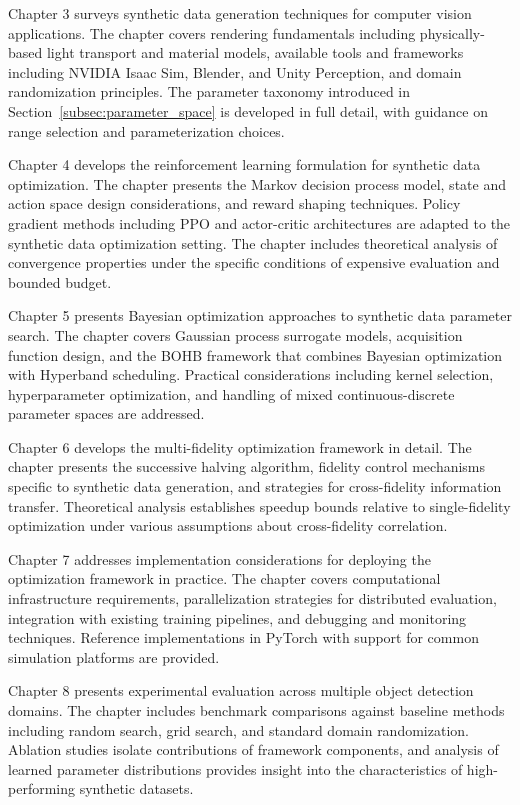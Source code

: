 Chapter 3 surveys synthetic data generation techniques for computer vision applications. The chapter covers rendering fundamentals including physically-based light transport and material models, available tools and frameworks including NVIDIA Isaac Sim, Blender, and Unity Perception, and domain randomization principles. The parameter taxonomy introduced in Section~\ref{subsec:parameter_space} is developed in full detail, with guidance on range selection and parameterization choices.

Chapter 4 develops the reinforcement learning formulation for synthetic data optimization. The chapter presents the Markov decision process model, state and action space design considerations, and reward shaping techniques. Policy gradient methods including PPO and actor-critic architectures are adapted to the synthetic data optimization setting. The chapter includes theoretical analysis of convergence properties under the specific conditions of expensive evaluation and bounded budget.

Chapter 5 presents Bayesian optimization approaches to synthetic data parameter search. The chapter covers Gaussian process surrogate models, acquisition function design, and the BOHB framework that combines Bayesian optimization with Hyperband scheduling. Practical considerations including kernel selection, hyperparameter optimization, and handling of mixed continuous-discrete parameter spaces are addressed.

Chapter 6 develops the multi-fidelity optimization framework in detail. The chapter presents the successive halving algorithm, fidelity control mechanisms specific to synthetic data generation, and strategies for cross-fidelity information transfer. Theoretical analysis establishes speedup bounds relative to single-fidelity optimization under various assumptions about cross-fidelity correlation.

Chapter 7 addresses implementation considerations for deploying the optimization framework in practice. The chapter covers computational infrastructure requirements, parallelization strategies for distributed evaluation, integration with existing training pipelines, and debugging and monitoring techniques. Reference implementations in PyTorch with support for common simulation platforms are provided.

Chapter 8 presents experimental evaluation across multiple object detection domains. The chapter includes benchmark comparisons against baseline methods including random search, grid search, and standard domain randomization. Ablation studies isolate contributions of framework components, and analysis of learned parameter distributions provides insight into the characteristics of high-performing synthetic datasets.

